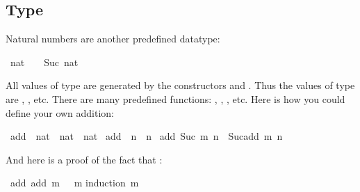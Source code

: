 \begin{isabellebody}
\begin{isamarkuptext}
\subsection{Type }

Natural numbers are another predefined datatype:
\begin{isabelle}%
\ nat\ {}\ {}\ {}\ Suc\ nat%
\end{isabelle}
All values of type  are generated by the constructors
 and . Thus the values of type  are
, ,  etc.
There are many predefined functions: , , , etc. Here is how you could define your own addition:%
\end{isamarkuptext}%
\isamarkuptrue%
\isamarkupfalse%
\ add\ {}{}\ {}nat\ {}\ nat\ {}\ nat{}\ \isanewline
{}add\ {}\ n\ {}\ n{}\ {}\isanewline
{}add\ {}Suc\ m{}\ n\ {}\ Suc{}add\ m\ n{}{}%
\begin{isamarkuptext}%
And here is a proof of the fact that :%
\end{isamarkuptext}%
\isamarkuptrue%
\isamarkupfalse%
\ add{}{}{}{}\ {}add\ m\ {}\ {}\ m{}\isanewline
%
\isadelimproof
%
\endisadelimproof
%
\isatagproof
{}\isamarkupfalse%
{}induction\ m{}\isanewline

\end{isabellebody}
